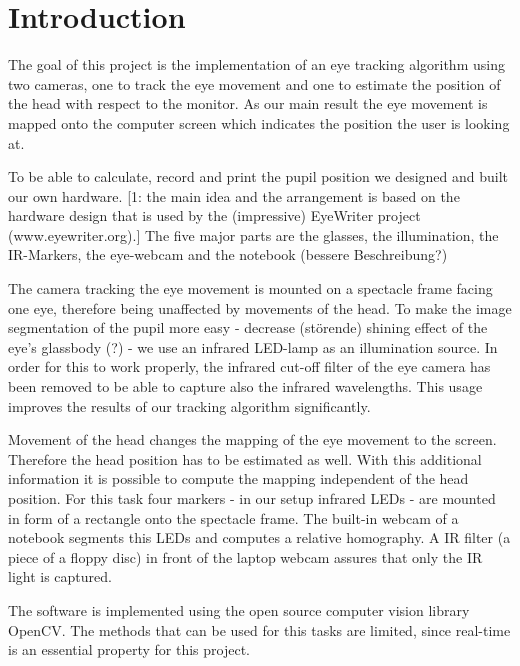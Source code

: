 \section{Introduction}\label{introduction}

The goal of this project is the implementation of an eye tracking algorithm using two cameras, one to track the eye movement and one to estimate the position of the head with respect to the monitor. As our main result the eye movement is mapped onto the computer screen which indicates the position the user is looking at. 

To be able to calculate, record and print the pupil position we designed and built our own hardware. [1: the main idea and the arrangement is based on the hardware design that is used by the (impressive) EyeWriter project (www.eyewriter.org).] 
The five major parts are the glasses, the illumination, the IR-Markers, the eye-webcam and the notebook (bessere Beschreibung?)

The camera tracking the eye movement is mounted on a spectacle frame facing one eye, therefore being unaffected by movements of the head. 
To make the image segmentation of the pupil more easy - decrease (störende) shining effect of the eye's glassbody (?) - we use an infrared LED-lamp as an illumination source. In order for this to work properly, the infrared cut-off filter of the eye camera has been removed to be able to capture also the infrared wavelengths. This usage improves the results of our tracking algorithm significantly.

Movement of the head changes the mapping of the eye movement to the screen. Therefore the head position has to be estimated as well.
With this additional information it is possible to compute the mapping independent of the head position. For this task four markers - in our setup infrared LEDs - are mounted in form of a rectangle onto the spectacle frame. The built-in webcam of a notebook segments this LEDs and computes a relative homography. A IR filter (a piece of a floppy disc) in front of the laptop webcam assures that only the IR light is captured. 

The software is implemented using the open source computer vision library OpenCV. The methods that can be used for this tasks are limited, since real-time is an essential property for this project.

